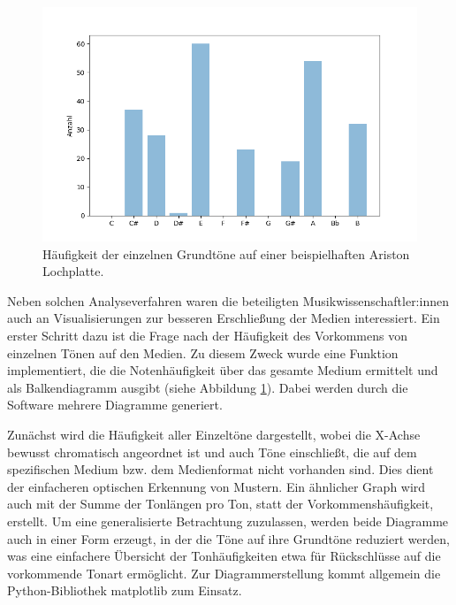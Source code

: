 \begin{figure}[t]
    \centering
    \includegraphics[width=\textwidth]{graphics/base_note_frequencies.png}
    \caption{Häufigkeit der einzelnen Grundtöne auf einer beispielhaften Ariston Lochplatte.}
    \label{barcharts}
\end{figure}

Neben solchen Analyseverfahren waren die beteiligten Musikwissenschaftler:innen auch an Visualisierungen zur besseren Erschließung der Medien interessiert.
Ein erster Schritt dazu ist die Frage nach der Häufigkeit des Vorkommens von einzelnen Tönen auf den Medien.
Zu diesem Zweck wurde eine Funktion implementiert, die die Notenhäufigkeit über das gesamte Medium ermittelt und als Balkendiagramm ausgibt (siehe Abbildung \ref{barcharts}).
Dabei werden durch die Software mehrere Diagramme generiert.

Zunächst wird die Häufigkeit aller Einzeltöne dargestellt, wobei die X-Achse bewusst chromatisch angeordnet ist und auch Töne einschließt, die auf dem spezifischen Medium bzw. dem Medienformat nicht vorhanden sind.
Dies dient der einfacheren optischen Erkennung von Mustern.
Ein ähnlicher Graph wird auch mit der Summe der Tonlängen pro Ton, statt der Vorkommenshäufigkeit, erstellt.
Um eine generalisierte Betrachtung zuzulassen, werden beide Diagramme auch in einer Form erzeugt, in der die Töne auf ihre Grundtöne reduziert werden, was eine einfachere Übersicht der Tonhäufigkeiten etwa für Rückschlüsse auf die vorkommende Tonart ermöglicht.
Zur Diagrammerstellung kommt allgemein die Python-Bibliothek matplotlib \parencite[]{Hunter_2007} zum Einsatz.

